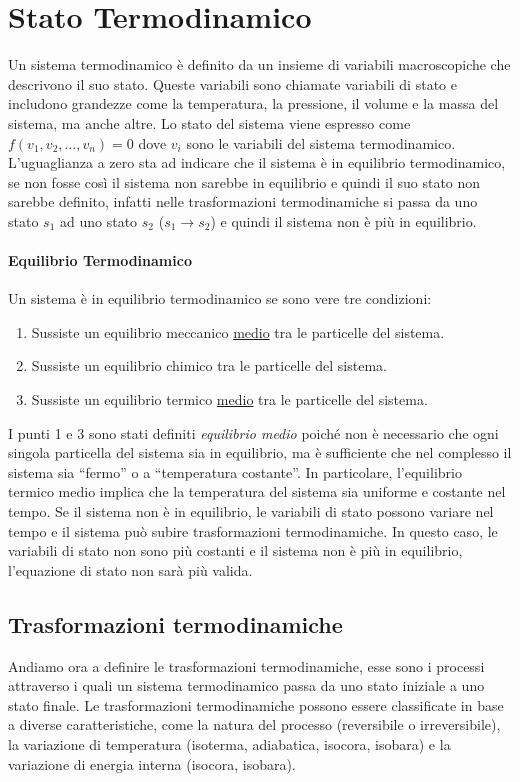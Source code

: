 \section{Stato Termodinamico}
    Un sistema termodinamico è definito da un insieme di variabili macroscopiche che descrivono il suo stato. Queste variabili sono chiamate variabili di stato e includono grandezze come la temperatura, la pressione, il volume e la massa del sistema, ma anche altre. Lo stato del sistema viene espresso come $f(v_1,v_2,\dots,v_n)=0$ dove $v_i$ sono le variabili del sistema termodinamico. L'uguaglianza a zero sta ad indicare che il sistema è in equilibrio termodinamico, se non fosse così il sistema non sarebbe in equilibrio e quindi il suo stato non sarebbe definito, infatti nelle trasformazioni termodinamiche si passa da uno stato $s_1$ ad uno stato $s_2$ ($s_1\rightarrow s_2$) e quindi il sistema non è più in equilibrio.
    \paragraph{Equilibrio Termodinamico}
        Un sistema è in equilibrio termodinamico se sono vere tre condizioni:
        \begin{enumerate}
            \item Sussiste un equilibrio meccanico \underline{medio} tra le particelle del sistema. 
            \item Sussiste un equilibrio chimico tra le particelle del sistema.
            \item Sussiste un equilibrio termico \underline{medio} tra le particelle del sistema.
        \end{enumerate}
        I punti 1 e 3 sono stati definiti \textit{equilibrio medio} poiché non è necessario che ogni singola particella del sistema sia in equilibrio, ma è sufficiente che nel complesso il sistema sia ``fermo'' o a ``temperatura costante''. In particolare, l'equilibrio termico medio implica che la temperatura del sistema sia uniforme e costante nel tempo. Se il sistema non è in equilibrio, le variabili di stato possono variare nel tempo e il sistema può subire trasformazioni termodinamiche. In questo caso, le variabili di stato non sono più costanti e il sistema non è più in equilibrio, l'equazione di stato non sarà più valida.
    \subsection{Trasformazioni termodinamiche}
        Andiamo ora a definire le trasformazioni termodinamiche, esse sono i processi attraverso i quali un sistema termodinamico passa da uno stato iniziale a uno stato finale. Le trasformazioni termodinamiche possono essere classificate in base a diverse caratteristiche, come la natura del processo (reversibile o irreversibile), la variazione di temperatura (isoterma, adiabatica, isocora, isobara) e la variazione di energia interna (isocora, isobara). 

